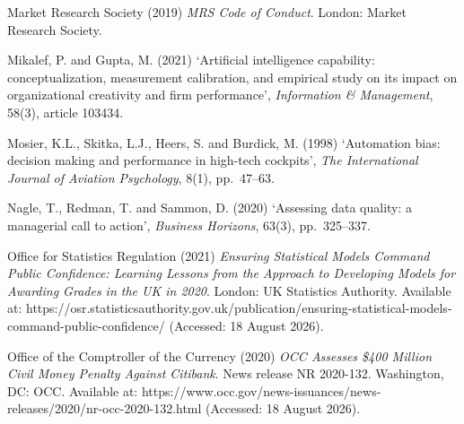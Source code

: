 \documentclass[11pt,a4paper]{article}
\numberwithin{figure}{section}
\numberwithin{table}{section}
\begin{document}
{\noindent\hypertarget{ref43}{}\begin{minipage}[t]{\dimexpr\linewidth-1.05cm\relax}Market Research Society (2019) \emph{MRS Code of Conduct}. London: Market Research Society.\end{minipage}\par\vspace{4pt}
\noindent\hypertarget{ref44}{}\begin{minipage}[t]{\dimexpr\linewidth-1.05cm\relax}Mikalef, P. and Gupta, M. (2021) `Artificial intelligence capability: conceptualization, measurement calibration, and empirical study on its impact on organizational creativity and firm performance', \emph{Information \& Management}, 58(3), article 103434.\end{minipage}\par\vspace{4pt}
\noindent\hypertarget{ref45}{}\begin{minipage}[t]{\dimexpr\linewidth-1.05cm\relax}Mosier, K.L., Skitka, L.J., Heers, S. and Burdick, M. (1998) `Automation bias: decision making and performance in high-tech cockpits', \emph{The International Journal of Aviation Psychology}, 8(1), pp.~47--63.\end{minipage}\par\vspace{4pt}
\noindent\hypertarget{ref46}{}\begin{minipage}[t]{\dimexpr\linewidth-1.05cm\relax}Nagle, T., Redman, T. and Sammon, D. (2020) `Assessing data quality: a managerial call to action', \emph{Business Horizons}, 63(3), pp.~325--337.\end{minipage}\par\vspace{4pt}
\noindent\hypertarget{ref47}{}\begin{minipage}[t]{\dimexpr\linewidth-1.05cm\relax}Office for Statistics Regulation (2021) \emph{Ensuring Statistical Models Command Public Confidence: Learning Lessons from the Approach to Developing Models for Awarding Grades in the UK in 2020}. London: UK Statistics Authority. Available at: https://osr.statisticsauthority.gov.uk/publication/ensuring-statistical-models-command-public-confidence/ (Accessed: 18 August 2026).\end{minipage}\par\vspace{4pt}
\noindent\hypertarget{ref48}{}\begin{minipage}[t]{\dimexpr\linewidth-1.05cm\relax}Office of the Comptroller of the Currency (2020) \emph{OCC Assesses \$400 Million Civil Money Penalty Against Citibank}. News release NR 2020-132. Washington, DC: OCC. Available at: https://www.occ.gov/news-issuances/news-releases/2020/nr-occ-2020-132.html (Accessed: 18 August 2026).\end{minipage}\par\vspace{4pt}
}
\end{document}
